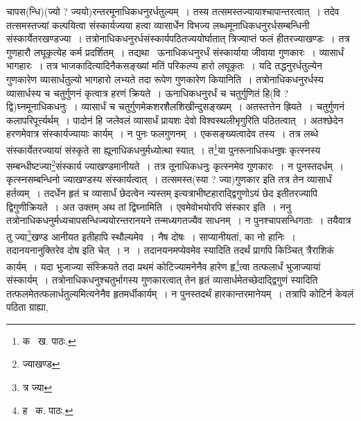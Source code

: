 \documentclass[11pt, openany]{book}
\begin{document}
\noindent चापस(न्धि)(ज्यो ? ज्ययो)रन्तरमूनाधिकधनुरर्धतुल्यम्~। तस्य तत्समस्तज्यायाश्चापान्तरत्वात्~। तदेव तत्समस्तज्यां कल्पयित्वा संस्कार्यज्यया हत्वा व्यासार्धेन विभज्य लब्धमूनाधिकधनुरर्धसम्बन्धिनी संस्कार्येतरखण्डज्या~। तत्रोनाधिकधनुरर्धसंस्कार्यपठितज्ययोर्घातात् त्रिज्याप्तं फलं हीतरज्याखण्डः~। तत्र गुणहारौ लघूकृत्येह कर्म प्रदर्शितम्~। तद्यथा \textendash\ ऊनाधिकधनुरर्धं संस्कार्याया जीवाया गुणकारः~। व्यासार्धं भागहारः~। तत्र भाजकादित्यादिनैकसङ्ख्यां मतिं परिकल्प्य हारो लघूकृतः~। यदि तद्धनुरर्धतुल्येन गुणकारेण व्यासार्धतुल्यो भागहारो लभ्यते तदा रूपेण गुणकारेण कियानिति~। तत्रोनाधिकधनुरर्धस्य व्यासार्धस्य च चतुर्गुणनं कृत्वात्र हरणं क्रियते~। ऊनाधिकधनुरर्धं च चतुर्गुणितं हि(वि ? द्वि)घ्नमूनाधिकधनुः~। व्यासार्धं च चतुर्गुणमेकशरशैलशिखीन्दुसङ्ख्यम्~। अतस्तत्तेन ह्रियते~। चतुर्गुणनं कलापरिपूर्त्त्यर्थम्~। पादोनं हि जलेवलं व्यासार्धं प्रायशः {\qt देवो विश्वस्थलीभृगुरि}ति पठितत्वात्~। अतश्छेदेन हरणमेवात्र संस्कार्यज्यायाः कार्यम्~। न पुनः फलगुणनम्~। एकसङ्ख्यत्वादेव तस्य~। तत्र लब्धे संस्कार्येतरज्यायां संस्कृते सा ह्यूनाधिकधनुर्मध्योत्था स्यात्~। त\renewcommand{\thefootnote}{१}\footnote{क \textendash\ ख. पाठः.}या पुनरूनाधिकधनुषः कृत्स्नस्य सम्बन्धीष्टज्या\renewcommand{\thefootnote}{२}\footnote{ज्याखण्ड}संस्कार्य ज्याखण्डमानीयते~। तत्र तूनाधिकधनुः कृत्स्नमेव गुणकारः~। न पुनस्तदर्धम्~। कृत्स्नसम्बन्धिनो ज्याखण्डस्य संस्कार्यत्वात्~। तत्समस्त(स्या ? ज्या)गुणकार इति तत्र तेन व्यासार्धं हर्तव्यम्~। तदर्धेन हृतं च व्यासार्धं छेदत्वेन न्यस्तम् इत्यत्राभीष्टहाराद्द्विगुणोऽयं छेद इतीतरज्यापि द्विगुणीक्रियते~। अत उक्तम् {\qt अथ तां द्विघ्ना}मिति~। एवमेवोभयोरपि संस्कार इति~। ननु तत्रोनाधिकधनुर्मध्यचापसन्धिज्ययोरन्तरानयने तन्मध्यगतज्यैव साधनम्~। न पुनश्चापसन्धिगताः~। तयैवात्र तु ज्या\renewcommand{\thefootnote}{३}\footnote{त्र ज्या}खण्ड आनीयत इतीहापि स्थौल्यमेव~। नैष दोषः~। साप्यानीयतां, का नो हानिः~। तदानयनानुक्तिरेव दोष इति चेत्~। न~। तदानयनमप्येवमेव स्यादिति तदर्थं प्रागपि किञ्चित् त्रैराशिकं कार्यम्~। यदा भुजाज्या संस्क्रियते तदा प्रथमं कोटिज्यामनेनैव हारेण हृ\renewcommand{\thefootnote}{१}\footnote{ह \textendash\ क. पाठः.}त्वा तत्फलार्धं भुजाज्यायां
संस्कार्यम्~। तत्रोनाधिकधनुश्चतुर्भागस्य गुणकारत्वात् तेन हृतं व्यासार्धमेतच्छेदाद्द्विगुणं स्यादिति तत्फलमेतत्फलार्धतुल्यमित्यनेनैव हृतमर्धीकार्यम्~। न 
पुनस्तदर्थं हारकान्तरमानेयम्~। तत्रापि कोटिर्न केवलं पठिता ग्राह्या,

\newpage
\end{document}
